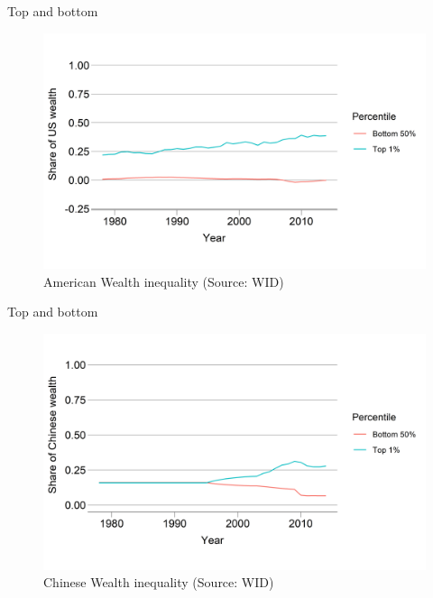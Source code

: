 \documentclass{beamer}
\begin{document}
\begin{frame}{Top and bottom} 
\begin{figure}
    \centering
    \includegraphics[width=\textwidth]{../img/InequalityTopUS.png}
    \caption{American Wealth inequality (Source: WID)}
\end{figure}
\end{frame}{}

\begin{frame}{Top and bottom} 
\begin{figure}
    \centering
    \includegraphics[width=\textwidth]{../img/InequalityTopCN.png}
    \caption{Chinese Wealth inequality (Source: WID)}
\end{figure}
\end{frame}{}
\end{document}
